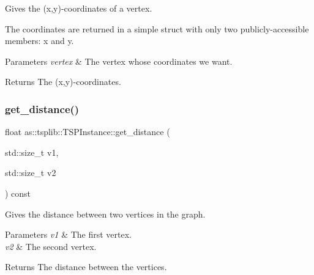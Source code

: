 Gives the (x,y)-\/coordinates of a vertex. 

The coordinates are returned in a simple struct with only two publicly-\/accessible members\+: x and y.


\begin{DoxyParams}{Parameters}
{\em vertex} & The vertex whose coordinates we want. \\
\hline
\end{DoxyParams}
\begin{DoxyReturn}{Returns}
The (x,y)-\/coordinates. 
\end{DoxyReturn}
\mbox{\label{classas_1_1tsplib_1_1TSPInstance_a52535b9ad72eaaac80f2a7a1518e680f}} 
\subsubsection{\texorpdfstring{get\+\_\+distance()}{get\_distance()}}
{\footnotesize\ttfamily float as\+::tsplib\+::\+T\+S\+P\+Instance\+::get\+\_\+distance (\begin{DoxyParamCaption}\item[{std\+::size\+\_\+t}]{v1,  }\item[{std\+::size\+\_\+t}]{v2 }\end{DoxyParamCaption}) const\hspace{0.3cm}{\ttfamily [inline]}}



Gives the distance between two vertices in the graph. 


\begin{DoxyParams}{Parameters}
{\em v1} & The first vertex. \\
\hline
{\em v2} & The second vertex. \\
\hline
\end{DoxyParams}
\begin{DoxyReturn}{Returns}
The distance between the vertices. 
\end{DoxyReturn}
\mbox{\label{classas_1_1tsplib_1_1TSPInstance_ace09ba6ff164a9569b95ebe772aeebfb}} 
